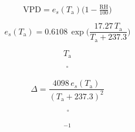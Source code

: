 \documentclass[preview,border=2pt]{standalone}
\begin{document}
\[
\mathrm{VPD} = e_s(T_\mathrm{a}) \Big(1 - \tfrac{\mathrm{RH}}{100}\Big)
\]

\[
e_s(T_\mathrm{a}) = 0.6108\,\exp\!\Big(\dfrac{17.27\,T_\mathrm{a}}{T_\mathrm{a}+237.3}\Big)
\]

\[
T_\mathrm{a}
\]

\[
^\circ
\]

\[
\Delta=\dfrac{4098\,e_s(T_\mathrm{a})}{(T_\mathrm{a}+237.3)^2}
\]

\[
\,^{\circ}\!
\]

\[
^{-1}
\]
\end{document}
